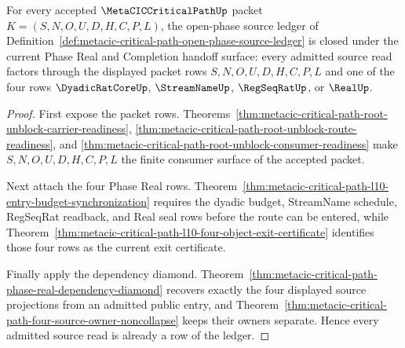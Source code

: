 \begin{theorem}
\label{thm:metacic-critical-path-open-phase-source-closure}
For every accepted $\MetaCICCriticalPathUp$ packet $K=(S,N,O,U,D,H,C,P,L)$, the open-phase source ledger of Definition~\ref{def:metacic-critical-path-open-phase-source-ledger} is closed under the current Phase Real and Completion handoff surface: every admitted source read factors through the displayed packet rows $S,N,O,U,D,H,C,P,L$ and one of the four rows $\DyadicRatCoreUp$, $\StreamNameUp$, $\RegSeqRatUp$, or $\RealUp$.
\end{theorem}
\begin{proof}
First expose the packet rows. Theorems~\ref{thm:metacic-critical-path-root-unblock-carrier-readiness}, \ref{thm:metacic-critical-path-root-unblock-route-readiness}, and \ref{thm:metacic-critical-path-root-unblock-consumer-readiness} make $S,N,O,U,D,H,C,P,L$ the finite consumer surface of the accepted packet.

Next attach the four Phase Real rows. Theorem~\ref{thm:metacic-critical-path-l10-entry-budget-synchronization} requires the dyadic budget, StreamName schedule, RegSeqRat readback, and Real seal rows before the route can be entered, while Theorem~\ref{thm:metacic-critical-path-l10-four-object-exit-certificate} identifies those four rows as the current exit certificate.

Finally apply the dependency diamond. Theorem~\ref{thm:metacic-critical-path-phase-real-dependency-diamond} recovers exactly the four displayed source projections from an admitted public entry, and Theorem~\ref{thm:metacic-critical-path-four-source-owner-noncollapse} keeps their owners separate. Hence every admitted source read is already a row of the ledger.
\end{proof}

